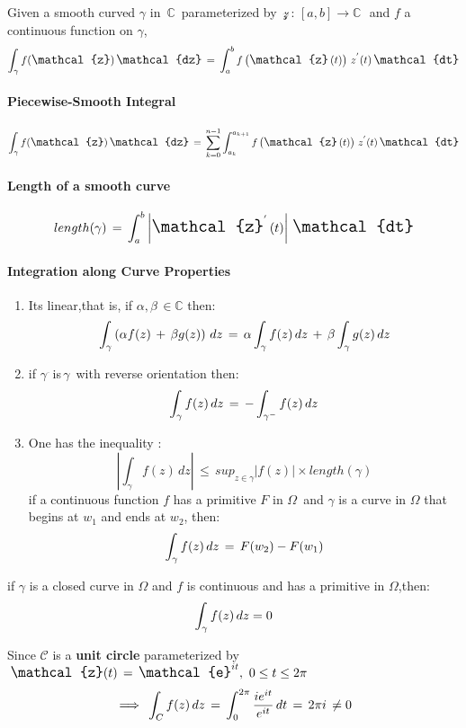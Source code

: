 \documentclass[11pt]{article}
\providecommand{\tightlist}{%
      \setlength{\itemsep}{0pt}\setlength{\parskip}{0pt}}
\begin{document}
Given a smooth curved \(\gamma\) in \(\,\mathbb{C}\,\) parameterized by
\(\,\mathcal{z}\,:\,\left[a,b\right]\to \mathbb{C}\,\,\) and \(f\) a
continuous function on \(\gamma\),
\[\large \int_{\gamma}{f(\mathcal{z})\,\mathcal{dz}}\,=\,\int_{a}^{b}{f\left(\mathcal{z}\left(t\right)\right)\,z^{'}(t)\,\mathcal{dt}}\]

\paragraph{Piecewise-Smooth Integral}\label{piecewise-smooth-integral}

\[\large \int_{\gamma}{f(\mathcal{z})\,\mathcal{dz}}\,=\,\sum_{k=0}^{n-1}{{\int_{a_{k}}^{a_{k+1}}{f\left(\mathcal{z}\left(t\right)\right)\,z^{'}(t)\,\mathcal{dt}}}}\]

\paragraph{Length of a smooth curve}\label{length-of-a-smooth-curve}

\[\Large length(\gamma)\,=\,\int_{a}^{b}{\left|\mathcal{z}^{'}\left(t\right)\right|\,\mathcal{dt}} \]

\paragraph{Integration along Curve
Properties}\label{integration-along-curve-properties}

\begin{enumerate}
\def\labelenumi{\roman{enumi})}
\tightlist
\item
  Its linear,that is, if \(\alpha,\beta\,\in\mathbb{C}\) then:
  \[\Large\int_{\gamma}{\left(\alpha f(z)\,+\,\beta g(z)\right)\,dz}\,=\,\alpha\int_{\gamma}{f(z)\,dz}\,+\,\beta\int_{\gamma}{g(z)\,dz}\]
\item
  if \(\gamma^{\overline{}}\,\)is\(\,\gamma\,\) with reverse orientation
  then:
  \[\Large\int_{\gamma}{f(z)\,dz}\,=\,-\int_{\gamma^{-}}{f(z)\,dz}\]
\item
  One has the inequality :
  \[\left|\int_{\gamma}{f(z)\,dz}\right|\,\le\,sup{\underset{z\in\gamma}{}\left|f(z)\right|\times length(\gamma)} \]
  if a continuous function \(f\) has a primitive \(F\) in \(\Omega\,\)
  and \(\gamma\) is a curve in \(\Omega\) that begins at \(w_{1}\) and
  ends at \(w_{2}\), then:
  \[\Large \int_{\gamma}{f(z)\,dz}\,=\,F(w_{2})-F(w_{1})\]
\end{enumerate}

if \(\gamma\) is a closed curve in \(\Omega\) and \(f\) is continuous
and has a primitive in \(\Omega\),then:
\[\Large\int_{\gamma}{f(z)\,dz}=0 \]

Since \(\mathcal{C}\) is a \textbf{unit circle} parameterized by
\(\large\,\mathcal{z}(t)\,=\,\mathcal{e}^{it},\,\,0\le t\le 2\pi\)
\[\Huge \implies\, \int_{C}{f(z)\,dz}\,=\,\int_{0}^{2\pi}{\frac{ie^{it}}{e^{it}}\,dt}\,=\,2\pi i\,\ne 0\]


    
    
    
\end{document}
